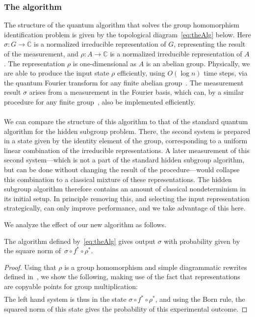 \subsubsection*{The algorithm}

The structure of the quantum algorithm that solves the group homomorphism identification problem is given by the topological diagram~\eqref{eq:theAlg} below. Here $\sigma:G\to\mathbb{C}$ is a normalized irreducible representation of $G$, representing the result of the measurement, and $\rho:A\to\mathbb{C}$ is a normalized irreducible representation of $A$. The representation $\rho$ is one-dimensional as $A$ is an abelian group. Physically, we are able to produce the input  state $\rho$ efficiently, using $O(\log n)$ time steps, via the quantum Fourier transform for any finite abelian group~\cite{cleve2000fast}. The measurement  result $\sigma$ arises from  a measurement in the Fourier basis, which can, by a similar procedure for any finite group~\cite{childs2010quantum}, also be implemented efficiently.
\begin{align}
\label{eq:theAlg}

\end{align}

We can compare the structure of this algorithm to that of the standard quantum algorithm for the hidden subgroup problem. There, the second system is prepared in a state given by the identity element of the group, corresponding to a uniform linear combination of the irreducible representations.  A later measurement of this second system---which is not a part of the standard hidden subgroup algorithm, but can be done without changing the result of the procedure---would collapse this combination to a classical mixture of these representations. The hidden subgroup algorithm therefore contains an amount of classical nondeterminism in its initial setup. In principle removing this, and selecting the input representation strategically, can only improve performance, and we take advantage of this here.

We analyze the effect of our new algorithm as follows.
\begin{lemma}
The algorithm defined by~\eqref{eq:theAlg} gives output $\sigma$ with probability given by the square norm of~$\sigma\circ f^*\circ\rho^*$.
\end{lemma}
\begin{proof}
Using that $\rho$ is a group homomorphism and simple diagrammatic rewrites defined in~\cite[Section~A.9]{vicary-tqa},
 we show the following, making use of the fact that representations are copyable points for group multiplication:
\begin{align}
\label{simplifyAlg}

\end{align}
The left hand system is thus in the state $\sigma\circ f^*\circ\rho^*$, and using the Born rule, the squared norm of this state gives the probability of this experimental outcome.
\end{proof}

